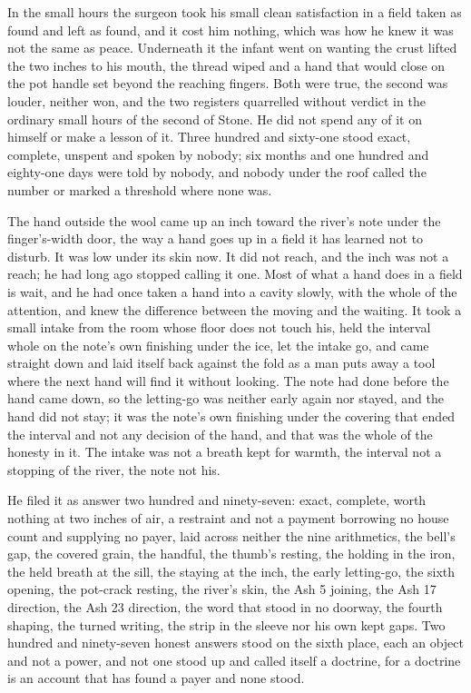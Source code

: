 \scenebreak

In the small hours the surgeon took his small clean satisfaction in a field taken as found and left as found, and it cost him nothing, which was how he knew it was not the same as peace. Underneath it the infant went on wanting the crust lifted the two inches to his mouth, the thread wiped and a hand that would close on the pot handle set beyond the reaching fingers. Both were true, the second was louder, neither won, and the two registers quarrelled without verdict in the ordinary small hours of the second of Stone. He did not spend any of it on himself or make a lesson of it. Three hundred and sixty-one stood exact, complete, unspent and spoken by nobody; six months and one hundred and eighty-one days were told by nobody, and nobody under the roof called the number or marked a threshold where none was.

The hand outside the wool came up an inch toward the river's note under the finger's-width door, the way a hand goes up in a field it has learned not to disturb. It was low under its skin now. It did not reach, and the inch was not a reach; he had long ago stopped calling it one. Most of what a hand does in a field is wait, and he had once taken a hand into a cavity slowly, with the whole of the attention, and knew the difference between the moving and the waiting. It took a small intake from the room whose floor does not touch his, held the interval whole on the note's own finishing under the ice, let the intake go, and came straight down and laid itself back against the fold as a man puts away a tool where the next hand will find it without looking. The note had done before the hand came down, so the letting-go was neither early again nor stayed, and the hand did not stay; it was the note's own finishing under the covering that ended the interval and not any decision of the hand, and that was the whole of the honesty in it. The intake was not a breath kept for warmth, the interval not a stopping of the river, the note not his.

He filed it as answer two hundred and ninety-seven: exact, complete, worth nothing at two inches of air, a restraint and not a payment borrowing no house count and supplying no payer, laid across neither the nine arithmetics, the bell's gap, the covered grain, the handful, the thumb's resting, the holding in the iron, the held breath at the sill, the staying at the inch, the early letting-go, the sixth opening, the pot-crack resting, the river's skin, the Ash 5 joining, the Ash 17 direction, the Ash 23 direction, the word that stood in no doorway, the fourth shaping, the turned writing, the strip in the sleeve nor his own kept gaps. Two hundred and ninety-seven honest answers stood on the sixth place, each an object and not a power, and not one stood up and called itself a doctrine, for a doctrine is an account that has found a payer and none stood.

